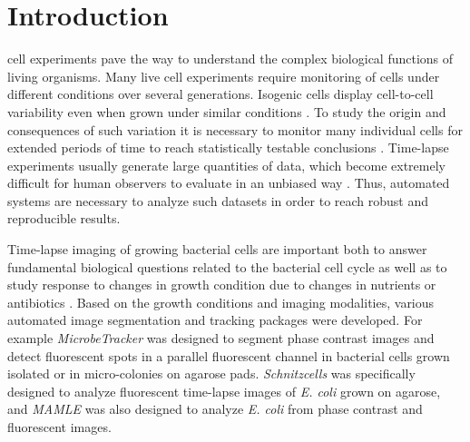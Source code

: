 \documentclass[journal]{IEEEtran}
\begin{document}
%
\IEEEpeerreviewmaketitle



\section{Introduction}
% 
% 
% 
% 
 cell experiments pave the way to understand the complex biological functions of living organisms. Many live cell experiments require monitoring of cells under different conditions over several generations. Isogenic cells display cell-to-cell variability even when grown under similar conditions \cite{elowitzstochastic2002}. To study the origin and consequences of such variation it is necessary to monitor many individual cells for extended periods of time to reach statistically testable conclusions \cite{yuichiquantify2010}. Time-lapse experiments usually generate large quantities of data, which become extremely difficult for human observers to evaluate in an unbiased way \cite{qiangmicroscope2008}. Thus, automated systems are necessary to analyze such datasets in order to reach robust and reproducible results. 

Time-lapse imaging of growing bacterial cells are important both to answer fundamental biological questions related to the bacterial cell cycle as well as to study response to changes in growth condition due to changes in nutrients or antibiotics \cite{walldenstudying2011}. Based on the growth conditions and imaging modalities, various automated image segmentation and tracking packages were developed. For example \textit{MicrobeTracker} \cite {sliusarenkohigh2011} was designed to segment phase contrast images and detect fluorescent spots in a parallel fluorescent channel in bacterial cells grown isolated or in micro-colonies on agarose pads. \textit{Schnitzcells} \cite{youngmeasuring2012} was specifically designed to analyze fluorescent time-lapse images of \textit{E. coli} grown on agarose, and \textit{MAMLE} \cite {chowdhurycell2013} was also designed to analyze \textit{E. coli} from phase contrast and fluorescent images.
\end{document}
